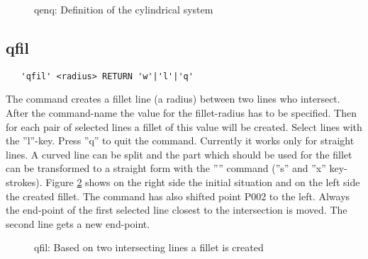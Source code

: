 \documentclass{article}
\begin{document}
\begin{figure}[h]
\caption{\label{qenqp}qenq: Definition of the cylindrical system}
\end{figure}

\subsection{\label{qfil}qfil}
\begin{verbatim}
   'qfil' <radius> RETURN 'w'|'l'|'q'
\end{verbatim}
The command creates a fillet line (a radius) between two lines who intersect. After the command-name the value for the fillet-radius has to be specified. Then for each pair of selected lines a fillet of this value will be created. Select lines with the ''l''-key. Press ''q'' to quit the command. Currently it works only for straight lines. A curved line can be split and the part which should be used for the fillet can be transformed to a straight form with the '''' command (''s'' and ''x'' key-strokes). Figure \ref{qfilp} shows on the right side the initial situation and on the left side the created fillet. The command has also shifted point P002 to the left. Always the end-point of the first selected line closest to the intersection is moved. The second line gets a new end-point. 
  
\begin{figure}[h]
\caption{\label{qfilp}qfil: Based on two intersecting lines a fillet is created }
\end{figure}
\end{document}
